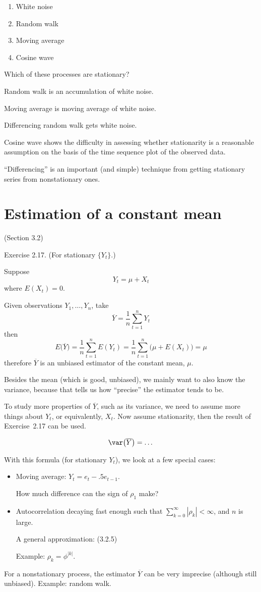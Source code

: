 \documentclass[12pt]{article}
\begin{document}
\begin{enumerate}
\item White noise
\item Random walk
\item Moving average
\item Cosine wave
\end{enumerate}

Which of these processes are stationary?

Random walk is an accumulation of white noise.

Moving average is moving average of white noise.

Differencing random walk gets white noise.

Cosine wave shows the difficulty in assessing whether stationarity is a
reasonable assumption on the basis of the time sequence plot of the
observed data.

``Differencing'' is an important (and simple) technique from getting
stationary series from nonstationary ones.


\section{Estimation of a constant mean}
(Section 3.2)

Exercise 2.17. (For stationary $\{Y_t\}$.)

Suppose
\[
Y_t = \mu + X_t
\]
where $E(X_t) = 0$.

Given observations $Y_1,\dotsc,Y_n$,
take
\[
\overline{Y} = \frac{1}{n}\sum_{t=1}^n Y_t
\]
then
\[
E\bigl(\overline{Y}\bigr)
= \frac{1}{n} \sum_{t=1}^n E(Y_t)
= \frac{1}{n} \sum_{t=1}^n \bigl(\mu + E(X_t)\bigr)
= \mu
\]
therefore $\overline{Y}$ is an unbiased estimator of the
constant mean, $\mu$.

Besides the mean (which is good, unbiased),
we mainly want to also know the variance,
because that tells us how ``precise'' the estimator tends to be.

To study more properties of $\overline{Y}$,
such as its variance,
we need to assume more things about $Y_t$, or equivalently,
$X_t$.
Now assume stationarity,
then the result of Exercise~2.17 can be used.

\[
\var\bigl(\overline{Y}\bigr) = \dotsc
\]

With this formula (for stationary $Y_t$), we look at a few special
cases:
\begin{itemize}
\item Moving average: $Y_t = e_t - .5e_{t-1}$.

    How much difference can the sign of $\rho_1$ make?
\item Autocorrelation decaying fast enough such that
    $\sum_{k=0}^\infty |\rho_k| < \infty$,
    and $n$ is large.

    A general approximation: (3.2.5)

    Example: $\rho_k = \phi^{|k|}$.
\end{itemize}

For a nonstationary process, the estimator $\overline{Y}$
can be very imprecise (although still unbiased).
Example: random walk.
\end{document}
